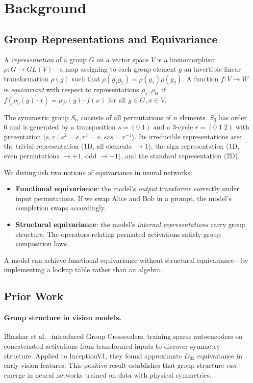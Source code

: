 \documentclass[10pt, letterpaper]{article}
\begin{document}
\section{Background}
\label{sec:background}

\subsection{Group Representations and Equivariance}

A \emph{representation} of a group $G$ on a vector space $V$ is a homomorphism $\rho: G \to GL(V)$---a map assigning to each group element $g$ an invertible linear transformation $\rho(g)$ such that $\rho(g_1 g_2) = \rho(g_1)\rho(g_2)$. A function $f: V \to W$ is \emph{equivariant} with respect to representations $\rho_V, \rho_W$ if $f(\rho_V(g) \cdot x) = \rho_W(g) \cdot f(x)$ for all $g \in G, x \in V$.

The symmetric group $S_n$ consists of all permutations of $n$ elements. $S_3$ has order 6 and is generated by a transposition $s = (0\;1)$ and a 3-cycle $r = (0\;1\;2)$ with presentation $\langle s, r \mid s^2 = e, r^3 = e, srs = r^{-1} \rangle$. Its irreducible representations are: the trivial representation (1D, all elements $\to 1$), the sign representation (1D, even permutations $\to +1$, odd $\to -1$), and the standard representation (2D).

We distinguish two notions of equivariance in neural networks:
\begin{itemize}[itemsep=2pt]
    \item \textbf{Functional equivariance}: the model's \emph{output} transforms correctly under input permutations. If we swap Alice and Bob in a prompt, the model's completion swaps accordingly.
    \item \textbf{Structural equivariance}: the model's \emph{internal representations} carry group structure. The operators relating permuted activations satisfy group composition laws.
\end{itemize}
A model can achieve functional equivariance without structural equivariance---by implementing a lookup table rather than an algebra.

\subsection{Prior Work}

\paragraph{Group structure in vision models.} Bhaskar et al.\ \cite{bhaskar2024group} introduced Group Crosscoders, training sparse autoencoders on concatenated activations from transformed inputs to discover symmetry structure. Applied to InceptionV1, they found approximate $D_{32}$ equivariance in early vision features. This positive result establishes that group structure \emph{can} emerge in neural networks trained on data with physical symmetries.
\end{document}
